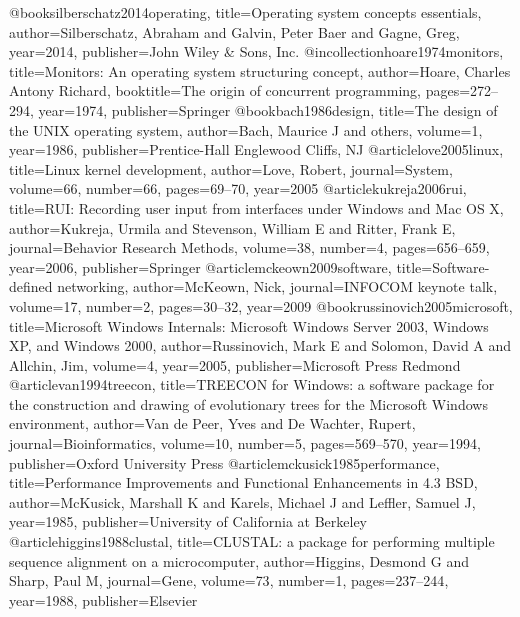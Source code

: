 @book{silberschatz2014operating,
  title={Operating system concepts essentials},
  author={Silberschatz, Abraham and Galvin, Peter Baer and Gagne, Greg},
  year={2014},
  publisher={John Wiley \& Sons, Inc.}
}
@incollection{hoare1974monitors,
  title={Monitors: An operating system structuring concept},
  author={Hoare, Charles Antony Richard},
  booktitle={The origin of concurrent programming},
  pages={272--294},
  year={1974},
  publisher={Springer}
}
@book{bach1986design,
  title={The design of the UNIX operating system},
  author={Bach, Maurice J and others},
  volume={1},
  year={1986},
  publisher={Prentice-Hall Englewood Cliffs, NJ}
}
@article{love2005linux,
  title={Linux kernel development},
  author={Love, Robert},
  journal={System},
  volume={66},
  number={66},
  pages={69--70},
  year={2005}
}
@article{kukreja2006rui,
  title={RUI: Recording user input from interfaces under Windows and Mac OS X},
  author={Kukreja, Urmila and Stevenson, William E and Ritter, Frank E},
  journal={Behavior Research Methods},
  volume={38},
  number={4},
  pages={656--659},
  year={2006},
  publisher={Springer}
}
@article{mckeown2009software,
  title={Software-defined networking},
  author={McKeown, Nick},
  journal={INFOCOM keynote talk},
  volume={17},
  number={2},
  pages={30--32},
  year={2009}
}
@book{russinovich2005microsoft,
  title={Microsoft Windows Internals: Microsoft Windows Server 2003, Windows XP, and Windows 2000},
  author={Russinovich, Mark E and Solomon, David A and Allchin, Jim},
  volume={4},
  year={2005},
  publisher={Microsoft Press Redmond}
}
@article{van1994treecon,
  title={TREECON for Windows: a software package for the construction and drawing of evolutionary trees for the Microsoft Windows environment},
  author={Van de Peer, Yves and De Wachter, Rupert},
  journal={Bioinformatics},
  volume={10},
  number={5},
  pages={569--570},
  year={1994},
  publisher={Oxford University Press}
}
@article{mckusick1985performance,
  title={Performance Improvements and Functional Enhancements in 4.3 BSD},
  author={McKusick, Marshall K and Karels, Michael J and Leffler, Samuel J},
  year={1985},
  publisher={University of California at Berkeley}
}
@article{higgins1988clustal,
  title={CLUSTAL: a package for performing multiple sequence alignment on a microcomputer},
  author={Higgins, Desmond G and Sharp, Paul M},
  journal={Gene},
  volume={73},
  number={1},
  pages={237--244},
  year={1988},
  publisher={Elsevier}
}
